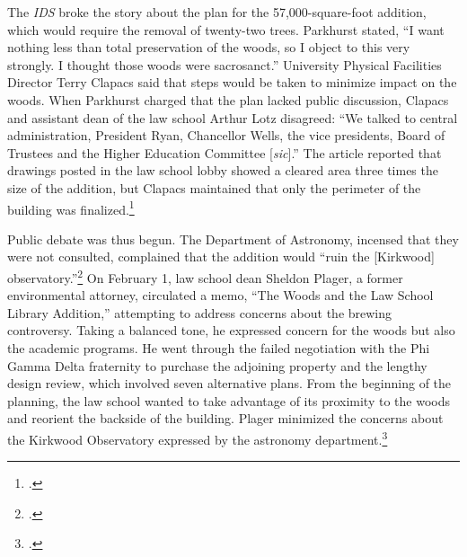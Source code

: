 \documentclass[
  american,
  letterpaper,
]{scrreprt}
\begin{document}
The \emph{IDS} broke the story about the plan for the 57,000-square-foot
addition, which would require the removal of twenty-two trees. Parkhurst
stated, ``I want nothing less than total preservation of the woods, so I
object to this very strongly. I thought those woods were sacrosanct.''
University Physical Facilities Director Terry Clapacs said that steps
would be taken to minimize impact on the woods. When Parkhurst charged
that the plan lacked public discussion, Clapacs and assistant dean of
the law school Arthur Lotz disagreed: ``We talked to central
administration, President Ryan, Chancellor Wells, the vice presidents,
Board of Trustees and the Higher Education Committee {[}\emph{sic}{]}.''
The article reported that drawings posted in the law school lobby showed
a cleared area three times the size of the addition, but Clapacs
maintained that only the perimeter of the building was
finalized.\footnote{.}

Public debate was thus begun. The Department of Astronomy, incensed that
they were not consulted, complained that the addition would ``ruin the
{[}Kirkwood{]} observatory.''\footnote{.} On February 1,
law school dean Sheldon Plager, a former environmental attorney,
circulated a memo, ``The Woods and the Law School Library Addition,''
attempting to address concerns about the brewing controversy. Taking a
balanced tone, he expressed concern for the woods but also the academic
programs. He went through the failed negotiation with the Phi Gamma
Delta fraternity to purchase the adjoining property and the lengthy
design review, which involved seven alternative plans. From the
beginning of the planning, the law school wanted to take advantage of
its proximity to the woods and reorient the backside of the building.
Plager minimized the concerns about the Kirkwood Observatory expressed
by the astronomy department.\footnote{.}
\end{document}
